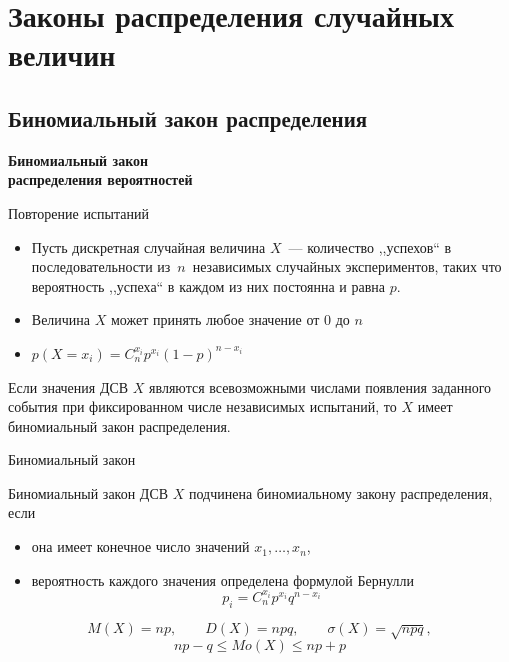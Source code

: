 \documentclass[unicode,11pt,notheorems,xcolor=table]{beamer}
\begin{document}


\section{Законы распределения случайных величин}


\subsection{Биномиальный закон распределения}

\begin{frame}{}{}
    {\centering \bfseries \Large Биномиальный закон \\распределения вероятностей\par}
\end{frame}

\begin{frame}{Повторение испытаний}{}
    \begin{itemize}
        \item 
            Пусть дискретная случайная величина $X$~--- количество ,,успехов`` в последовательности из $n$ независимых случайных экспериментов, таких что вероятность ,,успеха`` в каждом из них постоянна и равна $p$.
        \item Величина $X$ может принять любое значение от $0$ до $n$
        \item $\displaystyle  p(X=x_i) = C_n^{x_i} p^{x_i} (1-p)^{n-x_i}$
    \end{itemize}
    \begin{block}{}
    Если значения ДСВ $X$ являются всевозможными числами появления заданного события  при фиксированном числе независимых испытаний, то $X$ имеет биномиальный закон распределения.
    \end{block}
\end{frame}
    
    
\begin{frame}{Биномиальный закон}
    \begin{block}{Биномиальный закон}
        ДСВ $X$ подчинена {биномиальному закону распределения}, если 
        \begin{itemize}
            \item она имеет конечное число значений $x_1,\ldots, x_n$, 
            \item вероятность каждого значения определена формулой Бернулли
            $$
              p_i = C_n^{x_i} p^{x_i} q^{n-x_i} 
            $$
        \end{itemize}
    \end{block}    

    $$
     M(X)= np,\qquad D(X)=npq, \qquad \sigma(X)=\sqrt{npq},
    $$
    $$
        np-q \leqslant Mo(X) \leqslant np+p
    $$
    
\end{frame}
\end{document}
